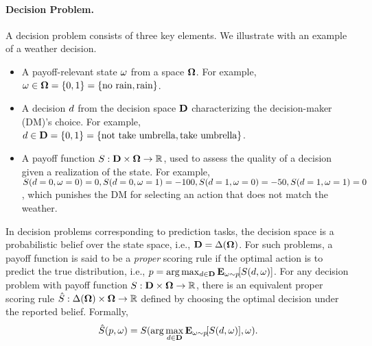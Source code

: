 \paragraph{Decision Problem.} A decision problem consists of three key elements. We illustrate with an example of a weather decision. 
\mvspace{-2mm}
\begin{itemize}[wide]
    \mvspace{-2mm}
    \item A payoff-relevant state $\omega$ from a space $\mathbf{\Omega}$. For example,\ $\omega \in \mathbf{\Omega} =  \{0, 1\} = \{\text{no rain}, \text{rain}\}$.
    \mvspace{-3mm}
    \item A decision $d$ from the decision space $\mathbf{D}$ characterizing the decision-maker (DM)'s choice. For example,\ $d\in \mathbf{D} = \{0, 1\} = \{\text{not take umbrella}, \text{take umbrella}\}$.
    \mvspace{-2mm}
    \item A payoff function $S: \mathbf{D}\times\mathbf{\Omega}\to\mathbb{R}$, used to assess the quality of a decision given a realization of the state. For example, $S(d = 0, \omega = 0) = 0, S(d = 0, \omega = 1) = -100, S(d = 1, \omega = 0) = -50, S(d = 1, \omega = 1) = 0$, which punishes the DM for selecting an action that does not match the weather. 
\end{itemize}

In decision problems corresponding to prediction tasks, the decision space is a probabilistic belief over the state space, i.e., $\mathbf{D} = \Delta(\mathbf{\Omega})$.
For such problems, a payoff function is said to be a \textit{proper} scoring rule if the optimal action is to predict the true distribution, i.e., $p = \arg \max_{\action \in \actionspace} \expect[\payoffstatevalue \sim p]{\score(\action, \payoffstatevalue)}$.
For any decision problem with payoff function $S: \mathbf{D}\times\mathbf{\Omega}\to\mathbb{R}$, there is an equivalent proper scoring rule $\hat{S}: \Delta(\mathbf{\Omega})\times\mathbf{\Omega}\to\mathbb{R}$ defined by choosing the optimal decision under the reported
belief. Formally,
\begin{equation}
\label{eq:properscoring}
    \hat{\score}(p, \payoffstatevalue) = \score(\arg \max_{\action \in \actionspace} \expect[\payoffstatevalue \sim p]{\score(\action, \payoffstatevalue)}, \payoffstatevalue).
\end{equation}


